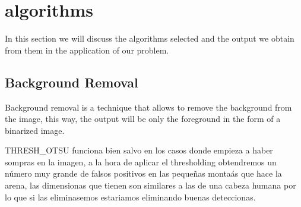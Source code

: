 \documentclass[11pt]{article}
\begin{document}


\section{algorithms}
In this section we will discuss the algorithms selected and the output we obtain from them in the application of our problem.

\subsection{Background Removal} 
Background removal is a technique that allows to remove the background from the image, this way, the output will be only the foreground in the form of a binarized image.


THRESH\_OTSU funciona bien salvo en los casos donde empieza a haber sompras en la imagen, a la hora de aplicar el thresholding obtendremos un número muy grande de falsos positivos en las pequeñas montaás que hace la arena, las dimensionas que tienen son similares a las de una cabeza humana por lo que si las eliminasemos estariamos eliminando buenas deteccionas.
\end{document}
